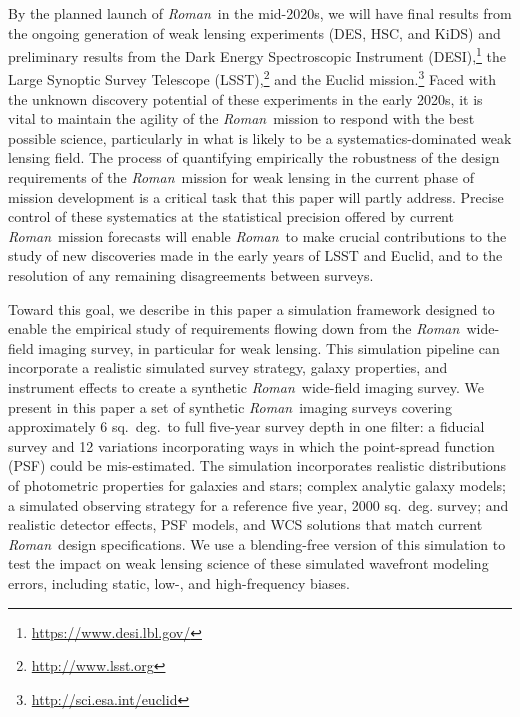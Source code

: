 \documentclass[usenatbib]{mnras}
\newcommand{\wfirst}{{\slshape Roman}}
\newcommand{\changetext}[1]{\textcolor{red}{#1}}
\begin{document}
By the planned launch of \wfirst\ in the mid-2020s, we will have final results from the ongoing generation of weak lensing experiments (DES, HSC, and KiDS) and preliminary results from the Dark Energy Spectroscopic Instrument (DESI),\footnote{\url{https://www.desi.lbl.gov/}} the Large Synoptic Survey Telescope (LSST),\footnote{\url{http://www.lsst.org}} and the Euclid mission.\footnote{\url{http://sci.esa.int/euclid}} 
Faced with the unknown discovery potential of these experiments in the early 2020s, it is vital to maintain the agility of the \wfirst\ mission to respond with the best possible science, particularly in what is likely to be a systematics-dominated weak lensing field.
The process of quantifying empirically the robustness of the design requirements of the \wfirst\ mission for weak lensing in the current phase of mission development is a critical task that this paper will partly address. 
Precise control of these systematics at the statistical precision offered by current \wfirst\ mission forecasts \changetext{\citep{2020arXiv200404702E, 2020arXiv200405271E}} will enable \wfirst\ to make crucial contributions to the study of new discoveries made in the early years of LSST and Euclid, and to the resolution of any remaining disagreements between surveys.

Toward this goal, we describe in this paper a simulation framework designed to enable the empirical study of requirements flowing down from the \wfirst\ wide-field imaging survey, in particular for weak lensing. 
This simulation pipeline can incorporate a realistic simulated survey strategy, galaxy properties, and instrument effects to create a synthetic \wfirst\ wide-field imaging survey. 
We present in this paper a set of synthetic \wfirst\ imaging surveys covering approximately 6 sq.~deg.~to full five-year survey depth in one filter: a fiducial survey and 12 variations incorporating ways in which the point-spread function (PSF) could be mis-estimated. 
The simulation incorporates realistic distributions of photometric properties for galaxies and stars; complex analytic galaxy models; a simulated observing strategy for a reference five year, 2000 sq.~deg. survey; and realistic detector effects, PSF models, and WCS solutions that match current \wfirst\ design specifications. 
We use a blending-free version of this simulation to test the impact on weak lensing science of these simulated wavefront modeling errors, including static, low-, and high-frequency biases. 
\end{document}
